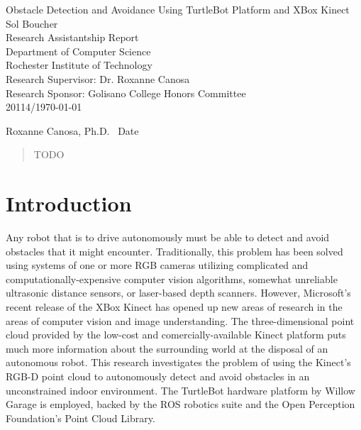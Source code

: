 \documentclass[12pt]{report}
\renewcommand{\Large}{\fontsize{18pt}{18pt}\selectfont}
\renewcommand{\large}{\fontsize{14pt}{14pt}\selectfont}
\begin{document}
\begin{titlepage}
\vspace*{\fill}
\begin{center}
{\Large Obstacle Detection and Avoidance Using TurtleBot Platform and XBox Kinect} \\
\vspace{18pt}
{\large Sol Boucher} \\
\vspace{14pt}
{\large Research Assistantship Report \\
	Department of Computer Science \\
	Rochester Institute of Technology} \\
\vspace{14pt}
Research Supervisor: Dr. Roxanne Canosa \\
Research Sponsor: Golisano College Honors Committee \\
\vspace{12pt}
20114/\today
\end{center}
\vspace{\fill}
Roxanne Canosa, Ph.D. \hrulefill\ Date \hrulefill
\end{titlepage}

\begin{abstract}
\thispagestyle{plain}
\setcounter{page}{2}
TODO
\end{abstract}

\setcounter{page}{3}
\tableofcontents
\clearpage
{}
{}
\listoffigures
\clearpage
{}
{}
\listoftables
\newpage

\section{Introduction}
Any robot that is to drive autonomously must be able to detect and avoid obstacles that it might encounter.  Traditionally, this problem has been solved using systems of one or more RGB cameras utilizing complicated and computationally-expensive computer vision algorithms, somewhat unreliable ultrasonic distance sensors, or laser-based depth scanners.  However, Microsoft's recent release of the XBox Kinect has opened up new areas of research in the areas of computer vision and image understanding.  The three-dimensional point cloud provided by the low-cost and comercially-available Kinect platform puts much more information about the surrounding world at the disposal of an autonomous robot.  This research investigates the problem of using the Kinect's RGB-D point cloud to autonomously detect and avoid obstacles in an unconstrained indoor environment.  The TurtleBot hardware platform by Willow Garage is employed, backed by the ROS robotics suite and the Open Perception Foundation's Point Cloud Library.
\end{document}

